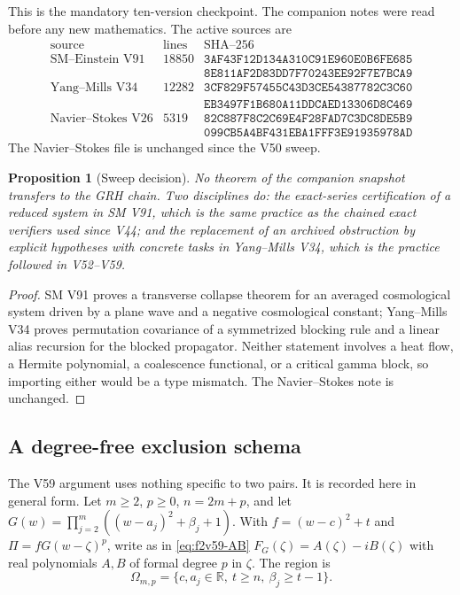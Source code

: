 \documentclass[11pt]{article}
\newtheorem{proposition}[theorem]{Proposition}
\theoremstyle{definition}
\theoremstyle{remark}
\begin{document}
This is the mandatory ten-version checkpoint.  The companion notes were
read before any new mathematics.  The active sources are
\begin{equation}
\begin{array}{c|r|l}
\text{source}&\text{lines}&\text{SHA--256}\\ \hline
\text{SM--Einstein V91}&18850&
\texttt{3AF43F12D134A310C91E960E0B6FE685}\\
&&\texttt{8E811AF2D83DD7F70243EE92F7E7BCA9}\\
\text{Yang--Mills V34}&12282&
\texttt{3CF829F57455C43D3CE54387782C3C60}\\
&&\texttt{EB3497F1B680A11DDCAED13306D8C469}\\
\text{Navier--Stokes V26}&5319&
\texttt{82C887F8C2C69E4F28FAD7C3DC8DE5B9}\\
&&\texttt{099CB5A4BF431EBA1FFF3E91935978AD}
\end{array}
\label{eq:f2v60-sources}
\end{equation}
The Navier--Stokes file is unchanged since the V50 sweep.

\begin{proposition}[Sweep decision]
\label{prop:f2v60-sweep}
No theorem of the companion snapshot transfers to the GRH chain.  Two
disciplines do: the exact-series certification of a reduced system in
SM V91, which is the same practice as the chained exact verifiers used
since V44; and the replacement of an archived obstruction by explicit
hypotheses with concrete tasks in Yang--Mills V34, which is the practice
followed in V52--V59.
\end{proposition}

\begin{proof}
SM V91 proves a transverse collapse theorem for an averaged
cosmological system driven by a plane wave and a negative cosmological
constant; Yang--Mills V34 proves permutation covariance of a symmetrized
blocking rule and a linear alias recursion for the blocked propagator.
Neither statement involves a heat flow, a Hermite polynomial, a
coalescence functional, or a critical gamma block, so importing either
would be a type mismatch.  The Navier--Stokes note is unchanged.
\end{proof}

\subsection{A degree-free exclusion schema}

The V59 argument uses nothing specific to two pairs.  It is recorded
here in general form.  Let \(m\ge2\), \(p\ge0\), \(n=2m+p\), and let
\(G(w)=\prod_{j=2}^m((w-a_j)^2+\beta_j+1)\).  With \(f=(w-c)^2+t\)
and \(\Pi=fG(w-\zeta)^p\), write as in \eqref{eq:f2v59-AB}
\(F_G(\zeta)=A(\zeta)-iB(\zeta)\) with real polynomials \(A,B\) of
formal degree \(p\) in \(\zeta\).  The region is
\begin{equation}
 \Omega_{m,p}=\{c,a_j\in\mathbb R,\ t\ge n,\ \beta_j\ge t-1\}.
 \label{eq:f2v60-region}
\end{equation}
\end{document}
